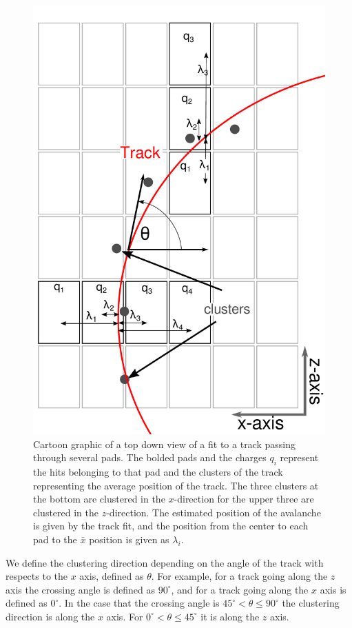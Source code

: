 \documentclass[review]{elsarticle}
\begin{document}
\begin{figure}[ht!]
\includegraphics[scale=.5]{top_view_helix_ext.pdf}
\caption{Cartoon graphic of a top down view of a fit to a track passing through several pads. The bolded pads and the charges $q_i$ represent the hits belonging to that pad and the clusters of the track representing the average position of the track. The three clusters at the bottom are clustered in the $x$-direction for the upper three are clustered in the $z$-direction. The estimated position of the avalanche is given by the track fit, and the position from the center to each pad to the $\bar{x}$ position is given as $\lambda_i$.}
\label{fig:topview}
\end{figure}

We define the clustering direction depending on the angle  of the track with respects to the $x$ axis, defined as $\theta$. For example, for a track going along the $z$ axis the crossing angle is defined as $90^{\circ}$, and for a track going along the $x$ axis is defined as $0^{\circ}$. In the case that the crossing angle is $45^{\circ} < \theta \leq 90^{\circ} $ the clustering direction is along the $x$ axis. For $0^{\circ} < \theta \leq 45^{\circ}$ it is along the $z$ axis. 
\end{document}
